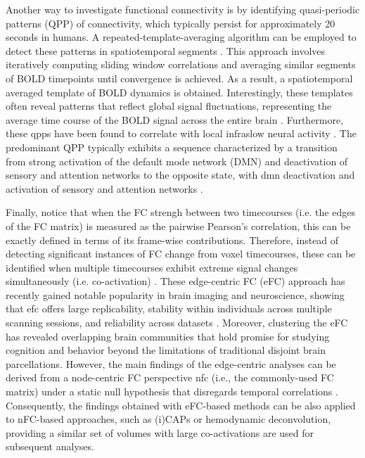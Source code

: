 Another way to investigate functional connectivity is by identifying
quasi-periodic patterns (QPP) of connectivity, which typically persist for
approximately 20 seconds in humans. A repeated-template-averaging algorithm can
be employed to detect these patterns in spatiotemporal segments
\citep{Majeed2011Spatiotemporaldynamicslow}. This approach involves iteratively
computing sliding window correlations and averaging similar segments of BOLD
timepoints until convergence is achieved. As a result, a spatiotemporal averaged
template of BOLD dynamics is obtained. Interestingly, these templates often
reveal patterns that reflect global signal fluctuations, representing the
average time course of the BOLD signal across the entire brain
\citep{Yousefi2018Quasiperiodicpatterns,Bolt2022parsimoniousdescriptionglobal}.
Furthermore, these \acrshort*{qpp}s have been found to correlate with local
infraslow neural activity \citep{Thompson2014Quasiperiodicpatterns}. The
predominant QPP typically exhibits a sequence characterized by a transition from
strong activation of the default mode network (DMN) and deactivation of sensory
and attention networks to the opposite state, with \acrshort*{dmn} deactivation
and activation of sensory and attention networks
\citep{Abbas2019Quasiperiodicpatterns,Yousefi2021Propagatingpatternsintrinsic}.

Finally, notice that when the FC strengh between two timecourses (i.e. the edges
of the FC matrix) is measured as the pairwise Pearson's correlation, this can be
exactly defined in terms of its frame-wise contributions. Therefore, instead of
detecting significant instances of FC change from voxel timecourses, these can
be identified when multiple timecourses exhibit extreme signal changes
simultaneously (i.e. co-activation)
\citep{Esfahlani2020Highamplitudecofluctuations,Faskowitz2020Edgecentricfunctional}.
These edge-centric FC (eFC) approach has recently gained notable popularity in
brain imaging and neuroscience, showing that \acrshort*{efc} offers large
replicability, stability within individuals across multiple scanning sessions,
and reliability across datasets \citep{Faskowitz2020Edgecentricfunctional}.
Moreover, clustering the eFC has revealed overlapping brain communities that
hold promise for studying cognition and behavior beyond the limitations of
traditional disjoint brain parcellations. However, the main findings of the
edge-centric analyses can be derived from a node-centric FC perspective
\acrshort*{nfc} (i.e., the commonly-used FC matrix) under a static null
hypothesis that disregards temporal correlations
\citep{Novelli2022mathematicalperspectiveedge}. Consequently, the findings
obtained with  eFC-based methods can be also applied to nFC-based approaches,
such as (i)CAPs or hemodynamic deconvolution, providing a similar set of volumes
with large co-activations are used for subsequent analyses.

